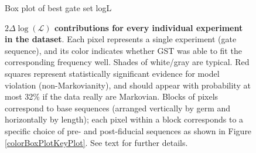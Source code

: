 \documentclass{article}[11pt]
\newcommand{\putfield}[2]{#2}
\begin{document}
{\begin{figure}
\begin{center}
\putfield{bestEstimateColorBoxPlotPages}{Box plot of best gate set logL}
\caption{\putfield{tt_bestEstimateColorBoxPlotPages}{}\textbf{$2\Delta\log(\mathcal{L})$ contributions for every individual experiment in the dataset}.   Each pixel represents a single experiment (gate sequence), and its color indicates whether GST was able to fit the corresponding frequency well.  Shades of white/gray are typical. Red squares represent statistically significant evidence for model violation (non-Markovianity), and should appear with probability at most \putfield{linlg_pcntle}{32}\% if the data really are Markovian. Blocks of pixels correspond to base sequences (arranged vertically by germ and horizontally by length); each pixel within a block corresponds to a specific choice of pre- and post-fiducial sequences as shown in Figure \ref{colorBoxPlotKeyPlot}.  See text for further details.\label{bestEstimateColorBoxPlot}}
\end{center}
\end{figure}

%

}{}
\end{document}
